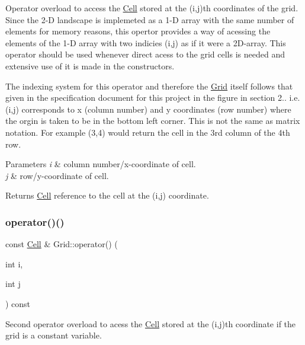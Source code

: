 Operator overload to access the \hyperlink{class_cell}{Cell} stored at the (i,j)th coordinates of the grid. Since the 2-\/D landscape is implemeted as a 1-\/D array with the same number of elements for memory reasons, this opertor provides a way of acessing the elements of the 1-\/D array with two indicies (i,j) as if it were a 2\+D-\/array. This operator should be used whenever direct acess to the grid cells is needed and extensive use of it is made in the constructors.

The indexing system for this operator and therefore the \hyperlink{class_grid}{Grid} itself follows that given in the specification document for this project in the figure in section 2.. i.\+e. (i,j) corresponds to x (column number) and y coordinates (row number) where the orgin is taken to be in the bottom left corner. This is not the same as matrix notation. For example (3,4) would return the cell in the 3rd column of the 4th row.


\begin{DoxyParams}{Parameters}
{\em i} & column number/x-\/coordinate of cell. \\
\hline
{\em j} & row/y-\/coordinate of cell.\\
\hline
\end{DoxyParams}
\begin{DoxyReturn}{Returns}
\hyperlink{class_cell}{Cell} reference to the cell at the (i,j) coordinate. 
\end{DoxyReturn}
\mbox{\label{class_grid_aa89f5c17cb78658f3b82a3b2d93aeb92}} 
\subsubsection{\texorpdfstring{operator()()}{operator()()}\hspace{0.1cm}{\footnotesize\ttfamily [2/2]}}
{\footnotesize\ttfamily const \hyperlink{class_cell}{Cell} \& Grid\+::operator() (\begin{DoxyParamCaption}\item[{int}]{i,  }\item[{int}]{j }\end{DoxyParamCaption}) const}



Second operator overload to acess the \hyperlink{class_cell}{Cell} stored at the (i,j)th coordinate if the grid is a constant variable. 

